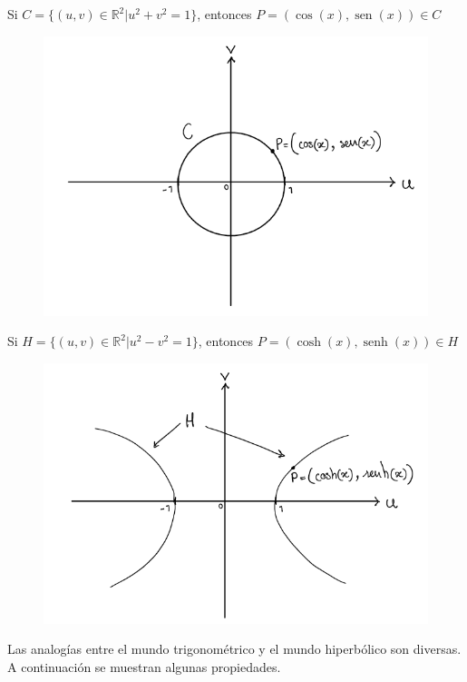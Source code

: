 \documentclass{article}
\numberwithin{equation}{section}
\DeclareMathOperator{\sen}{sen}
\DeclareMathOperator{\senh}{senh}
\begin{document}
\begin{multicols}{2}
    Si $C=\{(u,v)\in\mathbb{R}^2 | u^2+v^2=1\}$, entonces $P=(\cos(x), \sen(x))\in C$
    \begin{figure}[H]
        \centering
        \includegraphics[scale=0.4]{images/fig19.png}
        \label{fig:fig19}
    \end{figure}
    Si $H=\{(u,v)\in\mathbb{R}^2 | u^2-v^2=1\}$, entonces $P=(\cosh(x), \senh(x))\in H$
    \begin{figure}[H]
        \centering
        \includegraphics[scale=0.4]{images/fig20.png}
        \label{fig:fig20}
    \end{figure}
\end{multicols}

Las analogías entre el mundo trigonométrico y el mundo hiperbólico son diversas. A continuación se muestran algunas propiedades.
\end{document}
